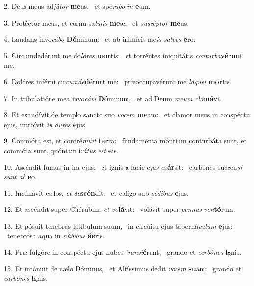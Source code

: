 2. Deus meus ad\textit{jú}\textit{tor} \textbf{me}us, \ast\  et spe\textit{rá}\textit{bo} \textit{in} \textbf{e}um.\

3. Protéctor meus, et cornu sa\textit{lú}\textit{tis} \textbf{me}æ, \ast\  et \textit{su}\textit{scép}\textit{tor} \textbf{me}us.\

4. Laudans invo\textit{cá}\textit{bo} \textbf{Dó}minum: \ast\  et ab inimícis me\textit{is} \textit{sal}\textit{vus} \textbf{e}ro.\

5. Circumdedérunt me do\textit{ló}\textit{res} \textbf{mor}tis: \ast\  et torréntes iniquitátis \textit{con}\textit{tur}\textit{ba}\textbf{vé}\textbf{runt} me.\

6. Dolóres inférni cir\textit{cum}\textit{de}\textbf{dé}runt me: \ast\  præoccupavérunt me \textit{lá}\textit{que}\textit{i} \textbf{mor}tis.\

7. In tribulatióne mea invo\textit{cá}\textit{vi} \textbf{Dó}minum, \ast\  et ad Deum \textit{me}\textit{um} \textit{cla}\textbf{má}vi.\

8. Et exaudívit de templo sancto suo \textit{vo}\textit{cem} \textbf{me}am: \ast\  et clamor meus in conspéctu ejus, introívit \textit{in} \textit{au}\textit{res} \textbf{e}jus.\

9. Commóta est, et contré\textit{mu}\textit{it} \textbf{ter}ra: \ast\  fundaménta móntium conturbáta sunt, et commóta sunt, quóniam i\textit{rá}\textit{tus} \textit{est} \textbf{e}is.\

10. Ascéndit fumus in ira ejus: \dag\  et ignis a fácie e\textit{jus} \textit{ex}\textbf{ár}sit: \ast\  carbónes succén\textit{si} \textit{sunt} \textit{ab} \textbf{e}o.\

11. Inclinávit cælos, \textit{et} \textit{de}\textbf{scén}dit: \ast\  et calígo sub \textit{pé}\textit{di}\textit{bus} \textbf{e}jus.\

12. Et ascéndit super Chérubim, \textit{et} \textit{vo}\textbf{lá}vit: \ast\  volávit super \textit{pen}\textit{nas} \textit{ven}\textbf{tó}rum.\

13. Et pósuit ténebras latíbulum suum, \dag\  in circúitu ejus taberná\textit{cu}\textit{lum} \textbf{e}jus: \ast\  tenebrósa aqua in \textit{nú}\textit{bi}\textit{bus} \textbf{á}\textbf{ë}ris.\

14. Præ fulgóre in conspéctu ejus nubes \textit{trans}\textit{i}\textbf{é}runt, \ast\  grando et \textit{car}\textit{bó}\textit{nes} \textbf{i}gnis.\

15. Et intónuit de cælo Dóminus, \dag\  et Altíssimus dedit \textit{vo}\textit{cem} \textbf{su}am: \ast\  grando et \textit{car}\textit{bó}\textit{nes} \textbf{i}gnis.\

